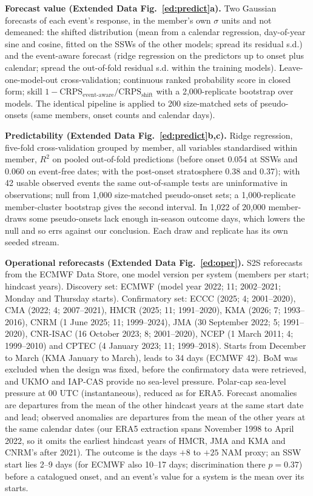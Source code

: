 \documentclass[11pt]{article}
\begin{document}
\textbf{Forecast value (Extended Data Fig.~\ref{ed:predict}a).} Two Gaussian forecasts of each event's response, in the member's own $\sigma$ units and not demeaned: the shifted distribution (mean from a calendar regression, day-of-year sine and cosine, fitted on the SSWs of the other models; spread its residual s.d.) and the event-aware forecast (ridge regression on the predictors up to onset plus calendar; spread the out-of-fold residual s.d. within the training models). Leave-one-model-out cross-validation; continuous ranked probability score in closed form; skill $1 - \mathrm{CRPS}_{\text{event-aware}}/\mathrm{CRPS}_{\text{shift}}$ with a 2,000-replicate bootstrap over models. The identical pipeline is applied to 200 size-matched sets of pseudo-onsets (same members, onset counts and calendar days).

\textbf{Predictability (Extended Data Fig.~\ref{ed:predict}b,c).} Ridge regression, five-fold cross-validation grouped by member, all variables standardised within member, $R^2$ on pooled out-of-fold predictions (before onset 0.054 at SSWs and 0.060 on event-free dates; with the post-onset stratosphere 0.38 and 0.37); with 42 usable observed events the same out-of-sample tests are uninformative in observations; null from 1,000 size-matched pseudo-onset sets; a 1,000-replicate member-cluster bootstrap gives the second interval. In 1,022 of 20,000 member-draws some pseudo-onsets lack enough in-season outcome days, which lowers the null and so errs against our conclusion. Each draw and replicate has its own seeded stream.

\textbf{Operational reforecasts (Extended Data Fig.~\ref{ed:oper}).} S2S reforecasts\cite{vitart17} from the ECMWF Data Store, one model version per system (members per start; hindcast years). Discovery set: ECMWF (model year 2022; 11; 2002–2021; Monday and Thursday starts). Confirmatory set: ECCC (2025; 4; 2001–2020), CMA (2022; 4; 2007–2021), HMCR (2025; 11; 1991–2020), KMA (2026; 7; 1993–2016), CNRM (1 June 2025; 11; 1999–2024), JMA (30 September 2022; 5; 1991–2020), CNR-ISAC (16 October 2023; 8; 2001–2020), NCEP (1 March 2011; 4; 1999–2010) and CPTEC (4 January 2023; 11; 1999–2018). Starts from December to March (KMA January to March), leads to 34 days (ECMWF 42). BoM was excluded when the design was fixed, before the confirmatory data were retrieved, and UKMO and IAP-CAS provide no sea-level pressure. Polar-cap sea-level pressure at 00 UTC (instantaneous), reduced as for ERA5. Forecast anomalies are departures from the mean of the other hindcast years at the same start date and lead; observed anomalies are departures from the mean of the other years at the same calendar dates (our ERA5 extraction spans November 1998 to April 2022, so it omits the earliest hindcast years of HMCR, JMA and KMA and CNRM's after 2021). The outcome is the days $+8$ to $+25$ NAM proxy; an SSW start lies 2–9 days (for ECMWF also 10–17 days; discrimination there $p = 0.37$) before a catalogued onset, and an event's value for a system is the mean over its starts.
\end{document}
